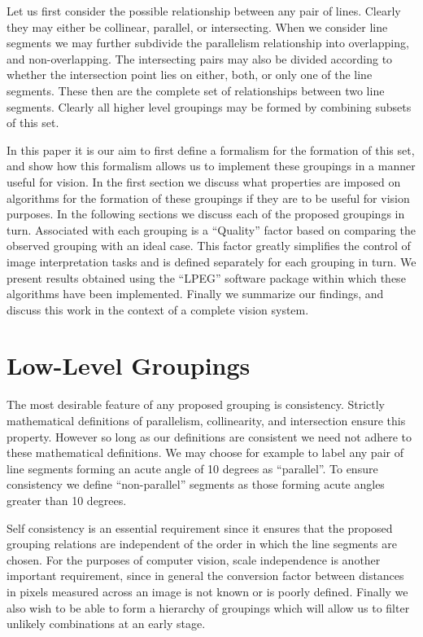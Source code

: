  Let us first consider the possible relationship between any pair of 
lines. Clearly they may either be collinear, parallel, or intersecting. When we
consider line segments we may further subdivide the parallelism relationship
into overlapping, and non-overlapping. The intersecting pairs may also be 
divided according to whether the intersection point lies on either, both, or
only one of the line segments. These then are the complete set of 
relationships between two line segments. Clearly all higher level groupings may
be formed by combining subsets of this set. 

 In this paper it is our aim to first define a formalism for the formation of 
this set, and show how this formalism allows us to implement these groupings
in a manner useful for vision. In the first section we discuss what properties 
are imposed on algorithms for the formation of these groupings if 
they are to be useful for vision purposes. In the following sections we discuss
each of the proposed groupings in turn. Associated with each grouping is a
``Quality'' factor based on comparing the observed grouping with an ideal 
case. This factor greatly simplifies the control of image interpretation tasks
and is defined separately for each grouping in turn. We present results 
obtained using the ``LPEG'' software package within which these algorithms 
have been implemented. Finally we summarize our findings, and discuss this 
work in the context of a complete vision system.

\section{Low-Level Groupings}

 The most desirable feature of any proposed grouping is consistency.
Strictly mathematical definitions of parallelism, collinearity, and 
intersection ensure this property. However so long as our definitions are 
consistent we need not adhere to these mathematical definitions. We may choose 
for example to label any pair of line segments forming an acute angle of 10 
degrees as ``parallel''. To ensure consistency we define ``non-parallel'' 
segments as those forming acute angles greater than 10 degrees.

 Self consistency is an essential requirement since it ensures that the 
proposed grouping relations are independent of the order in which the line 
segments are chosen.  For the purposes of computer vision, scale independence 
is another important requirement, since in general the conversion factor 
between distances in pixels measured across an image is not known or is 
poorly defined. Finally we also wish to be able to form a hierarchy of 
groupings which will allow us to filter unlikely combinations at an early 
stage. 

